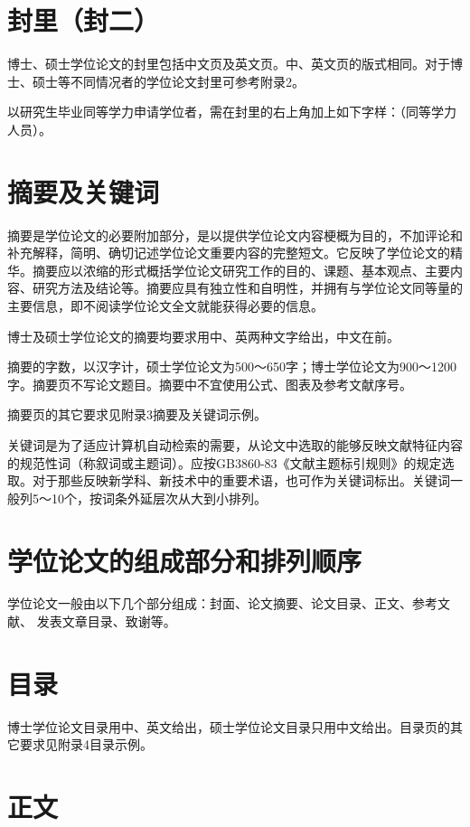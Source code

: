 \section{封里（封二）}\label{appendixA-2}

博士、硕士学位论文的封里包括中文页及英文页。中、英文页的版式相同。对于博士、硕士等不同情况者的学位论文封里可参考附录2。

以研究生毕业同等学力申请学位者，需在封里的右上角加上如下字样：（同等学力人员）。

\section{摘要及关键词}\label{appendixA-3}

摘要是学位论文的必要附加部分，是以提供学位论文内容梗概为目的，不加评论和补充解释，简明、确切记述学位论文重要内容的完整短文。它反映了学位论文的精华。摘要应以浓缩的形式概括学位论文研究工作的目的、课题、基本观点、主要内容、研究方法及结论等。摘要应具有独立性和自明性，并拥有与学位论文同等量的主要信息，即不阅读学位论文全文就能获得必要的信息。

博士及硕士学位论文的摘要均要求用中、英两种文字给出，中文在前。

摘要的字数，以汉字计，硕士学位论文为500～650字；博士学位论文为900～1200字。摘要页不写论文题目。摘要中不宜使用公式、图表及参考文献序号。

摘要页的其它要求见附录3摘要及关键词示例。

关键词是为了适应计算机自动检索的需要，从论文中选取的能够反映文献特征内容的规范性词（称叙词或主题词）。应按GB3860-83《文献主题标引规则》的规定选取。对于那些反映新学科、新技术中的重要术语，也可作为关键词标出。关键词一般列5～10个，按词条外延层次从大到小排列。

\section{学位论文的组成部分和排列顺序}\label{appendixA-4}

学位论文一般由以下几个部分组成：封面、论文摘要、论文目录、正文、参考文献、
发表文章目录、致谢等。

\section{目录}\label{appendixA-5}

博士学位论文目录用中、英文给出，硕士学位论文目录只用中文给出。目录页的其它要求见附录4目录示例。

\section{正文}\label{appendixA-6}

